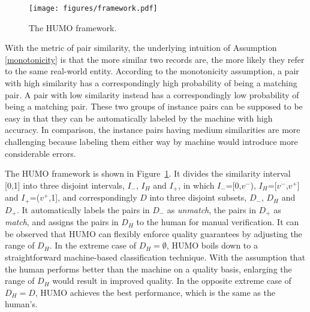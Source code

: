 \begin{figure}[h]
\setlength{\abovecaptionskip}{\figcaptionspace}
\centering
\texttt{[image: figures/framework.pdf]}
\caption{The HUMO framework.}
\label{fig_basic_idea}
\end{figure}


  With the metric of pair similarity, the underlying intuition of Assumption \ref{monotonicity} is that the more similar two records are, the more likely they refer to the same real-world entity. According to the monotonicity assumption, a pair with high similarity has a correspondingly high probability of being a matching pair. A pair with low similarity instead has a correspondingly low probability of being a matching pair. These two groups of instance pairs can be supposed to be easy in that they can be automatically labeled by the machine with high accuracy. In comparison, the instance pairs having medium similarities are more challenging because labeling them either way by machine would introduce more considerable errors.


  The HUMO framework is shown in Figure~\ref{fig_basic_idea}. It divides the similarity interval [0,1] into three disjoint intervals, $I_-$, $I_H$ and $I_+$, in which $I_-$=[0,$v^-$), $I_H$=[$v^-$,$v^+$] and $I_+$=($v^+$,1], and correspondingly $D$ into three disjoint subsets, $D_-$, $D_H$ and $D_+$. It automatically labels the pairs in $D_-$ as {\em unmatch}, the pairs in $D_+$ as {\em match}, and assigns the pairs in $D_H$ to the human for manual verification. It can be observed that HUMO can flexibly enforce quality guarantees by adjusting the range of $D_H$. In the extreme case of $D_H=\emptyset$, HUMO boils down to a straightforward machine-based classification technique. With the assumption that the human performs better than the machine on a quality basis, enlarging the range of $D_H$ would result in improved quality. In the opposite extreme case of $D_H=D$, HUMO achieves the best performance, which is the same as the human's.


